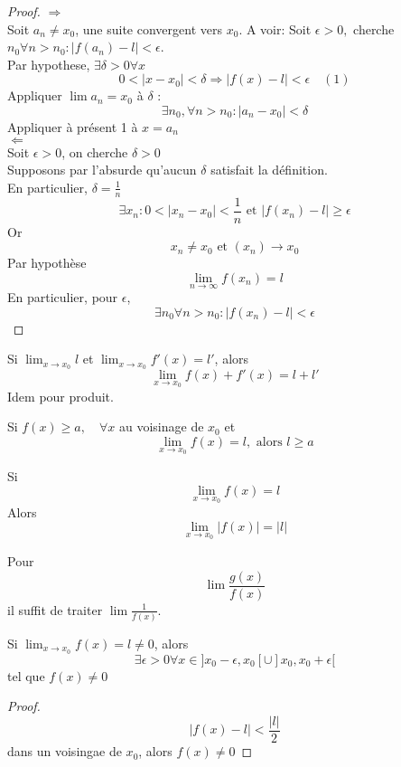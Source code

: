 \documentclass[../main.tex]{subfiles}
\begin{document}
\begin{proof}
$\Rightarrow$ \\
Soit $a_n \neq x_0$, une suite convergent vers $x_0$. A voir: Soit  $\epsilon>0,$ cherche $ n_0 \forall n >n_0: |f(a_n) - l| < \epsilon$.\\
Par hypothese, $\exists \delta>0 \forall x$ 
\[ 
	0 < |x-x_0| < \delta \Rightarrow |f(x)-l| <\epsilon \quad ( 1)
\]
Appliquer $\lim a_n = x_0$ à $\delta$ :
\[ 
	\exists n_0, \forall n >n_0: |a_n-x_0| < \delta 
\]
Appliquer à présent 1 à $x= a_n$\\
$\Leftarrow$\\
Soit  $\epsilon >0$, on cherche $\delta>0$ \\
Supposons par l'absurde qu'aucun $\delta$ satisfait la définition.\\
En particulier, $\delta = \frac{1}{n}$ 
\[ 
	\exists x_n: 0<|x_n-x_0| < \frac{1}{n} \text{ et } |f(x_n)-l| \geq \epsilon 
\]
Or
\[ 
	x_n \neq x_0 \text{ et } ( x_n) \to x_0
\]
Par hypothèse
\[ 
	\lim_{n \to \infty} f(x_n) =l
\]
En particulier, pour $\epsilon$,
\[ 
	\exists n_0 \forall n >n_0 : |f(x_n) -l| <\epsilon
\]

\end{proof}
\begin{crly}
	Si $\lim_{x \to x_0} l$ et $ \lim_{x \to x_0} f'(x) = l'$, alors
	\[ 
		\lim_{x \to x_0} f(x) + f'(x) = l+l'
	\]
Idem pour produit.	
\end{crly}
\begin{crly}
	Si $f(x) \geq a, \quad \forall x$ au voisinage de $ x_0$ et
	\[ 
		\lim_{x \to x_0} f(x) = l, \text{ alors } l \geq a
	\]
	
\end{crly}
\begin{crly}
Si
\[ 
	\lim_{x \to x_0} f(x)=l
\]
Alors
\[ 
	\lim_{x \to x_0} |f(x)| = |l|
\]


\end{crly}
\begin{crly}
Pour
\[ 
	\lim \frac{g(x)}{f(x)}
\]
il suffit de traiter $\lim \frac{1}{f(x)}$.

\end{crly}
\begin{lemma}
	Si $ \lim_{x \to x_0} f(x) =l \neq 0$, alors
	 \[ 
		 \exists \epsilon>0 \forall x \in ]x_0-\epsilon,x_0[ \cup ]x_0,x_0+\epsilon[
	\]
	tel que $f(x) \neq 0$
\end{lemma}
\begin{proof}
\[ 
	|f(x) -l | < \frac{|l|}{2}
\]
dans un voisingae de $x_0$, alors
$f(x) \neq 0$
\end{proof}
\end{document}
